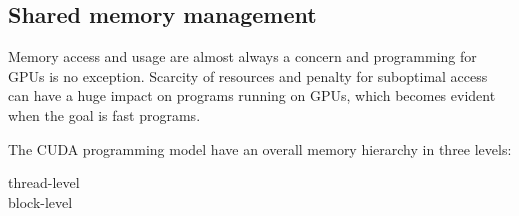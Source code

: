 \subsection{Shared memory management}

Memory access and usage are almost always a concern and
programming for GPUs is no exception. Scarcity of resources
and penalty for suboptimal access can have a huge impact on
programs running on GPUs, which becomes evident when the
goal is fast programs.

The CUDA programming model have an overall memory hierarchy
in three levels:
%
\begin{description}
  \item[thread-level]
  \item[block-level]
  \item[]
\end{description}
%

